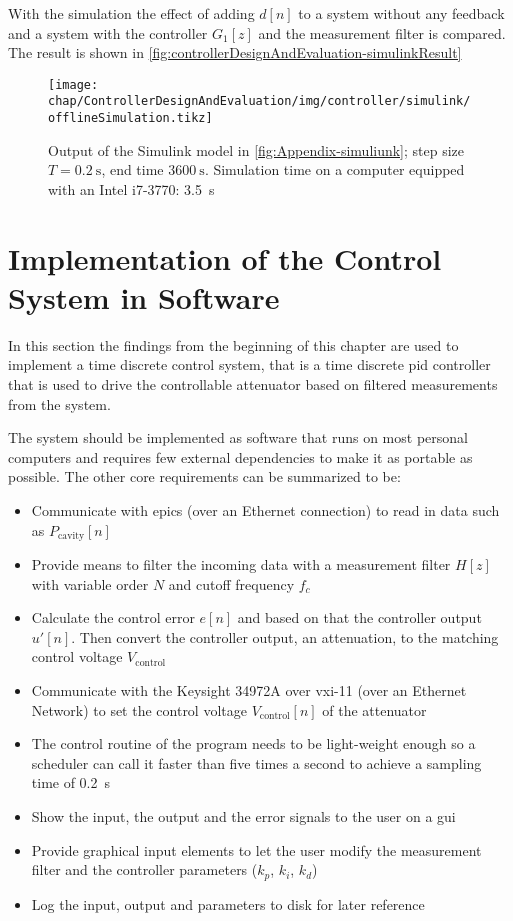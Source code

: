 With the simulation the effect of adding $d[n]$ to a system without any feedback and a system with the controller $G_1[z]$ and the measurement filter is compared. The result is shown in \autoref{fig:controllerDesignAndEvaluation-simulinkResult}

\begin{figure}[tb]
	\centering
	\texttt{[image: chap/ControllerDesignAndEvaluation/img/controller/simulink/offlineSimulation.tikz]}
	\caption[Output offline evaluation]{Output of the Simulink model in \autoref{fig:Appendix-simuliunk}; step size $T=\SI{0.2}{\second}$, end time $\SI{3600}{\second}$. Simulation time on a computer equipped with an Intel i7-3770: \SI{3.5}{\second}}
	\label{fig:controllerDesignAndEvaluation-simulinkResult}
\end{figure}







\newpage
\section{Implementation of the Control System in Software}
In this section the findings from the beginning of this chapter are used to implement a time discrete control system, that is a time discrete \gls{pid} controller that is used to drive the controllable attenuator based on filtered measurements from the system.

The system should be implemented as software that runs on most personal computers and requires few external dependencies to make it as portable as possible. The other core requirements can be summarized to be:
\begin{itemize}
\item Communicate with \gls{epics} (over an Ethernet connection) to read in data such as $P_\text{cavity}[n]$
\item Provide means to filter the incoming data with a measurement filter $H[z]$ with variable order $N$ and cutoff frequency $f_c$
\item Calculate the control error $e[n]$ and based on that the controller output $u'[n]$. Then convert the controller output, an attenuation, to the matching control voltage $V_\text{control}$
\item Communicate with the Keysight 34972A over \gls{vxi-11} (over an Ethernet Network) to set the control voltage $V_\text{control}[n]$ of the attenuator
\item The control routine of the program needs to be light-weight enough so a scheduler can call it faster than five times a second to achieve a sampling time of \SI{0.2}{\second}
\item Show the input, the output and the error signals to the user on a \gls{gui}
\item Provide graphical input elements to let the user modify the measurement filter and the controller parameters ($k_p$, $k_i$, $k_d$)
\item Log the input, output and parameters to disk for later reference
\end{itemize}

